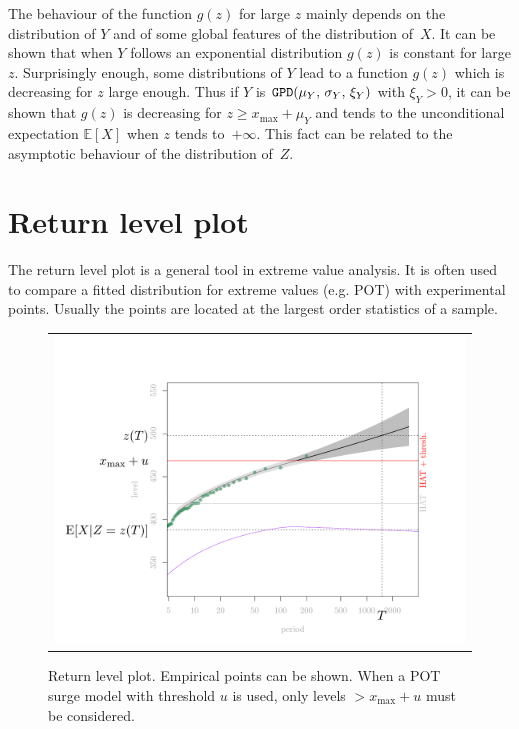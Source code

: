 \documentclass[11pt,a4paper]{report}\usepackage[]{graphicx}\usepackage[]{color}
\newcommand{\Esp}{\mathbb{E}}
\newcommand{\Up}[1]{#1_{\mathrm{max}}}
\begin{document}
The behaviour of the function $g(z)$ for large $z$ mainly depends on
the distribution of $Y$ and of some global features of the 
distribution of~$X$. It can be shown that when
$Y$ follows an exponential distribution $g(z)$ is constant for large $z$.  
Surprisingly enough, some
distributions of $Y$ lead to a function $g(z)$ which is decreasing for
$z$ large enough. Thus if $Y$ is
$\verb@GPD@(\mu_Y,\,\sigma_Y,\,\xi_Y)$ with $\xi_Y > 0$, it can be
shown that $g(z)$ is decreasing for $z \geqslant \Up{x} +
\mu_Y$ and tends to the unconditional expectation $\Esp[X]$ when $z$
tends to~$+\infty$. This fact can be related to the asymptotic behaviour
of the distribution of~$Z$.


\section{Return level plot}
The return level plot is a general tool in extreme value analysis. It
is often used to compare a fitted distribution for extreme values
(e.g. POT) with experimental points. Usually the points are located at
the largest order statistics of a sample.


\begin{figure}
   \centering
   \begin{tabular}{c} 
     \includegraphics[width=12cm]{figures/figure/RLplot-1.pdf} 
   \end{tabular}
   \caption{\label{FigReturnLevel} Return level plot.  Empirical
     points can be shown. When a POT surge model with threshold $u$ is
     used, only levels $> \Up{x} + u$ must be considered. }
\end{figure}
\end{document}
